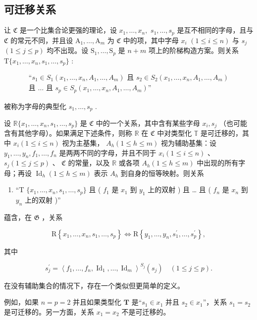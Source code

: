 \subsection{可迁移关系}

让 \(\mathfrak{C}\) 是一个比集合论更强的理论，设 \(x_{1},\ldots ,x_{n},\) \(s_1,\ldots ,s_p\) 是互不相同的字母，且与 \(\mathfrak{C}\) 的常元不同，并且设 \(\mathrm{A}_1,\ldots ,\mathrm{A}_m\) 为 \(\mathfrak{C}\) 中的项，其中字母 \(x_{i}\) \((1\leqslant i\leqslant n)\) 与 \(s_j\) \((1\leqslant j\leqslant p)\) 均不出现。设 \(\mathrm{S}_1,\ldots ,\mathrm{S}_p\) 是 \(n + m\) 项上的阶梯构造方案。则关系 \(\mathrm{T}\{x_1,\dots,x_n,s_1,\dots,s_p\}\) :

\[
\begin{array}{c}
\text{``}s_{1} \in S_{1}(x_{1}, \ldots, x_{n}, A_{1}, \ldots, A_{m})
\text{ 且 }s_{2} \in S_{2}(x_{1}, \ldots, x_{n}, A_{1}, \ldots, A_{m}) \\
\text{且 }\ldots\text{ 且 }s_{p} \in S_{p}(x_{1}, \ldots, x_{n}, A_{1}, \ldots, A_{m})\text{''}
\end{array}
\]

被称为字母的典型化 \(s_{1}, \ldots, s_{p}\) .

设 \(\mathbb{R}\{x_1, \ldots, x_n, s_1, \ldots, s_p\}\) 是 \(\mathfrak{C}\) 中的一个关系，其中含有某些字母 \(x_i, s_j\) （也可能含有其他字母）。如果满足下述条件，则称 \(\mathbb{R}\) 在 \(\mathfrak{C}\) 中对类型化 \(\mathbb{T}\) 是可迁移的，其中 \(x_i (1 \leqslant i \leqslant n)\) 视为主基集， \(A_h (1 \leqslant h \leqslant m)\) 视为辅助基集：设 \(y_1, \ldots, y_n, f_1, \ldots, f_n\) 是两两不同的字母，并且不同于 \(x_i (1 \leqslant i \leqslant n)\) 、 \(s_j (1 \leqslant j \leqslant p)\) 、 \(\mathfrak{C}\) 的常量，以及 \(\mathbb{R}\) 或各项 \(A_h (1 \leqslant h \leqslant m)\) 中出现的所有字母；再设 \(\operatorname{Id}_h (1 \leqslant h \leqslant m)\) 表示 \(A_h\) 到自身的恒等映射。则关系

\begin{enumerate}
\def\labelenumi{(\arabic{enumi})}
\tightlist
\item
  “T \(\{x_{1},\ldots,x_{n},s_{1},\ldots,s_{p}\}\) 且 ( \(f_{1}\) 是 \(x_{1}\) 到 \(y_{1}\) 上的双射 ) 且 \ldots{} 且 ( \(f_{n}\) 是 \(x_{n}\) 到 \(y_{n}\) 上的双射 )''
\end{enumerate}

蕴含，在 \(\mathfrak{G}\) ，关系

\[
\mathrm{R} \left\{x _ {1}, \dots , x _ {n}, s _ {1}, \dots , s _ {p} \right\} \Longleftrightarrow \mathrm{R} \left\{y _ {1}, \dots , y _ {n}, s _ {1} ^ {\prime}, \dots , s _ {p} ^ {\prime} \right\},\tag{2}
\]

其中

\[
s _ {j} ^ {\prime} = \left\langle f _ {1}, \dots , f _ {n}, \operatorname{Id} _ {1}, \dots , \operatorname{Id} _ {m} \right\rangle^ {S_j} (s _ {j}) \quad (1 \leqslant j \leqslant p).\tag{3}
\]

在没有辅助集合的情况下，存在一个类似但更简单的定义。

例如，如果 \(n = p = 2\) 并且如果类型化 \(\mathbf{T}\) 是“\(s_1 \in x_1\) 并且 \(s_2 \in x_1\)''，关系 \(s_1 = s_2\) 是可迁移的。另一方面，关系 \(x_1 = x_2\) 不是可迁移的。

